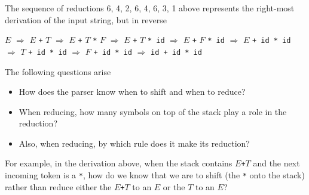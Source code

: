 \documentclass[8pt,a4paper,compress]{beamer}
\newcommand{\mm}[1]{$#1$}
\newenvironment{spaced}
{
\smallskip
\hspace{.5cm}
\begin{minipage}[c]{\textwidth}
}
{
\end{minipage}
\smallskip
}
\begin{document}
\begin{frame}[fragile]
\pause

The sequence of reductions 6, 4, 2, 6, 4, 6, 3, 1 above represents the right-most derivation of the input string, but in reverse

\text{ }
\begin{spaced}
\begin{production}
\underline{\mm{E}} \mm{\Rightarrow} \mm{E} \lstinline{+} \underline{\mm{T}}
   \mm{\Rightarrow} \mm{E} \lstinline{+} \mm{T} \lstinline{*} \underline{\mm{F}}
   \mm{\Rightarrow} \mm{E} \lstinline{+} \underline{\mm{T}} \lstinline{* id}
   \mm{\Rightarrow} \mm{E} \lstinline{+} \underline{\mm{F}} \lstinline{* id}
   \mm{\Rightarrow} \underline{\mm{E}} \lstinline{+ id * id}
   \mm{\Rightarrow} \underline{\mm{T}} \lstinline{+ id * id}
   \mm{\Rightarrow} \underline{\mm{F}} \lstinline{+ id * id}
   \mm{\Rightarrow} \lstinline{id + id * id}
\end{production}
\end{spaced}

\pause
\bigskip

The following questions arise
\begin{itemize}
\item How does the parser know when to shift and when to reduce?
\item When reducing, how many symbols on top of the stack play a role in the reduction?
\item Also, when reducing, by which rule does it make its reduction?
\end{itemize}

\pause
\bigskip

For example, in the derivation above, when the stack contains $E$\lstinline{+}$T$ and the next incoming token is a \lstinline{*}, how do we know that we are to shift (the \lstinline{*} onto the stack) rather than reduce either the $E$\lstinline{+}$T$ to an $E$ or the $T$ to an $E$?
\end{frame}
\end{document}
